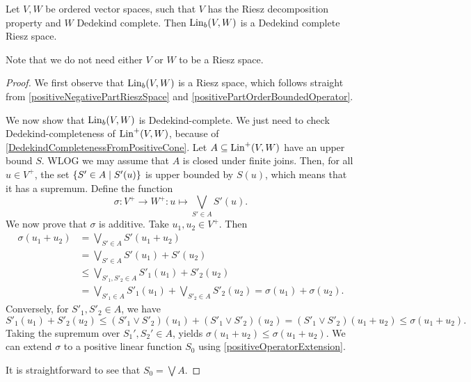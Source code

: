 \begin{proposition}
Let $V,W$ be ordered vector spaces, such that $V$ has the Riesz decomposition property and $W$ Dedekind complete. Then $\operatorname{Lin}_b(V,W)$ is a Dedekind complete Riesz space.
\end{proposition}
Note that we do not need either $V$ or $W$ to be a Riesz space.
\begin{proof}
We first observe that $\operatorname{Lin}_b(V,W)$ is a Riesz space, which follows straight from \ref{positiveNegativePartRieszSpace} and \ref{positivePartOrderBoundedOperator}.

We now show that $\operatorname{Lin}_b(V,W)$ is Dedekind-complete. We just need to check Dedekind-completeness of $\operatorname{Lin}^+(V,W)$, because of \ref{DedekindCompletenessFromPositiveCone}. Let $A\subseteq \operatorname{Lin}^+(V,W)$ have an upper bound $S$. WLOG we may assume that $A$ is closed under finite joins. Then, for all $u\in V^+$, the set $\setbuilder{S'\in A}{S'(u)}$ is upper bounded by $S(u)$, which means that it has a supremum. Define the function
\[ \sigma: V^+ \to W^+: u \mapsto \bigvee_{S'\in A}S'(u). \]
We now prove that $\sigma$ is additive. Take $u_1,u_2\in V^+$. Then
\begin{align*}
\sigma(u_1 +u_2) &= \bigvee_{S'\in A}S'(u_1 + u_2) \\
&= \bigvee_{S'\in A}S'(u_1) + S'(u_2) \\
&\leq \bigvee_{S'_1, S'_2\in A}S'_1(u_1) + S'_2(u_2) \\
&= \bigvee_{S'_1\in A}S'_1(u_1) + \bigvee_{S'_2\in A}S'_2(u_2) = \sigma(u_1) + \sigma(u_2).
\end{align*}
Conversely, for $S'_1, S'_2\in A$, we have
\[ S'_1(u_1) + S'_2(u_2) \leq (S'_1\vee S'_2)(u_1) + (S'_1\vee S'_2)(u_2) = (S'_1\vee S'_2)(u_1 +u_2) \leq \sigma(u_1 + u_2). \]
Taking the supremum over $S_1',S_2'\in A$, yields $\sigma(u_1 +u_2) \leq \sigma(u_1 + u_2)$.
We can extend $\sigma$ to a positive linear function $S_0$ using \ref{positiveOperatorExtension}.

It is straightforward to see that $S_0 = \bigvee A$.
\end{proof}

